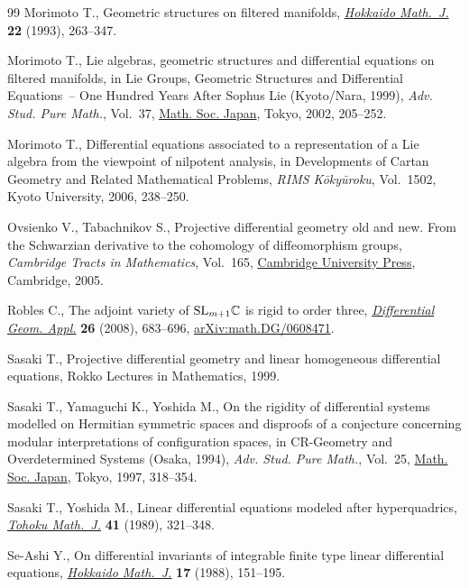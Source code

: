 \begin{thebibliography}{99}
Morimoto T., Geometric structures on filtered manifolds, \href{https://doi.org/10.14492/hokmj/1381413178}{\textit{Hokkaido
 Math.~J.}} \textbf{22} (1993), 263--347.

Morimoto T., Lie algebras, geometric structures and differential equations on
 filtered manifolds, in Lie Groups, Geometric Structures and Differential
 Equations~-- One Hundred Years After {S}ophus {L}ie ({K}yoto/{N}ara, 1999),
 \textit{Adv. Stud. Pure Math.}, Vol.~37, \href{https://doi.org/10.2969/aspm/03710205}{Math. Soc. Japan}, Tokyo, 2002,
 205--252.

Morimoto T., Differential equations associated to a representation of a {L}ie
 algebra from the viewpoint of nilpotent analysis, in Developments of Cartan
 Geometry and Related Mathematical Problems, \textit{RIMS K\=oky\=uroku}, Vol.~1502, Kyoto University, 2006, 238--250.

Ovsienko V., Tabachnikov S., Projective differential geometry old and new. From
 the Schwarzian derivative to the cohomology of diffeomorphism groups,
 \textit{Cambridge Tracts in Mathematics}, Vol.~165, \href{https://doi.org/10.1017/CBO9780511543142}{Cambridge University
 Press}, Cambridge, 2005.

Robles C., The adjoint variety of {${\rm SL}_{m+1}\mathbb C$} is rigid to order
 three, \href{https://doi.org/10.1016/j.difgeo.2008.04.017}{\textit{Differential Geom. Appl.}} \textbf{26} (2008), 683--696,
 \href{https://arxiv.org/abs/math.DG/0608471}{arXiv:math.DG/0608471}.

Sasaki T., Projective differential geometry and linear homogeneous differential
 equations, {R}okko Lectures in Mathematics, 1999.

Sasaki T., Yamaguchi K., Yoshida M., On the rigidity of differential systems
 modelled on {H}ermitian symmetric spaces and disproofs of a conjecture
 concerning modular interpretations of configuration spaces, in C{R}-Geometry
 and Overdetermined Systems ({O}saka, 1994), \textit{Adv. Stud. Pure Math.},
 Vol.~25, \href{https://doi.org/10.2969/aspm/02510318}{Math. Soc. Japan}, Tokyo, 1997, 318--354.

Sasaki T., Yoshida M., Linear differential equations modeled after
 hyperquadrics, \href{https://doi.org/10.2748/tmj/1178227829}{\textit{Tohoku Math.~J.}} \textbf{41} (1989), 321--348.

Se-Ashi Y., On differential invariants of integrable finite type linear
 differential equations, \href{https://doi.org/10.14492/hokmj/1381517803}{\textit{Hokkaido Math.~J.}} \textbf{17} (1988),
 151--195.


\end{thebibliography}
